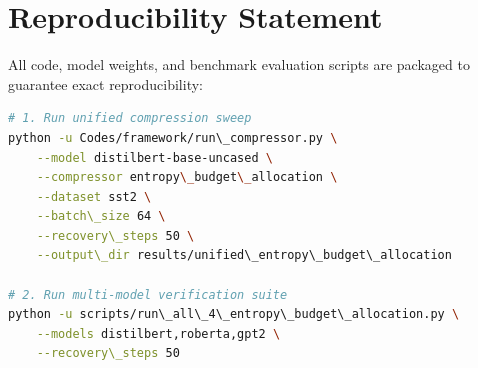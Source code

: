 \section{Reproducibility Statement}
All code, model weights, and benchmark evaluation scripts are packaged to guarantee exact reproducibility:
\begin{lstlisting}[language=bash]
# 1. Run unified compression sweep
python -u Codes/framework/run\_compressor.py \
    --model distilbert-base-uncased \
    --compressor entropy\_budget\_allocation \
    --dataset sst2 \
    --batch\_size 64 \
    --recovery\_steps 50 \
    --output\_dir results/unified\_entropy\_budget\_allocation

# 2. Run multi-model verification suite
python -u scripts/run\_all\_4\_entropy\_budget\_allocation.py \
    --models distilbert,roberta,gpt2 \
    --recovery\_steps 50
\end{lstlisting}
